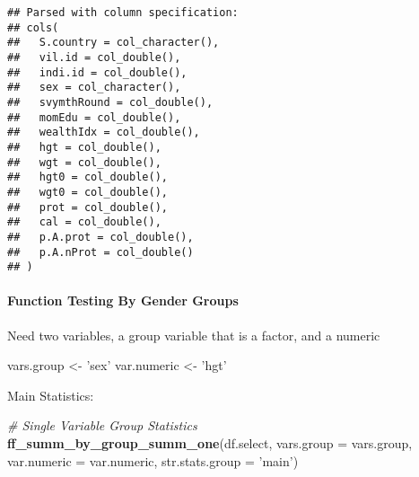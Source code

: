 \documentclass[
]{book}
\newenvironment{Shaded}{\begin{snugshade}}{\end{snugshade}}
\newcommand{\CommentTok}[1]{\textcolor[rgb]{0.56,0.35,0.01}{\textit{#1}}}
\newcommand{\DataTypeTok}[1]{\textcolor[rgb]{0.13,0.29,0.53}{#1}}
\newcommand{\KeywordTok}[1]{\textcolor[rgb]{0.13,0.29,0.53}{\textbf{#1}}}
\newcommand{\NormalTok}[1]{#1}
\newcommand{\OperatorTok}[1]{\textcolor[rgb]{0.81,0.36,0.00}{\textbf{#1}}}
\newcommand{\StringTok}[1]{\textcolor[rgb]{0.31,0.60,0.02}{#1}}
\begin{document}
\begin{verbatim}
## Parsed with column specification:
## cols(
##   S.country = col_character(),
##   vil.id = col_double(),
##   indi.id = col_double(),
##   sex = col_character(),
##   svymthRound = col_double(),
##   momEdu = col_double(),
##   wealthIdx = col_double(),
##   hgt = col_double(),
##   wgt = col_double(),
##   hgt0 = col_double(),
##   wgt0 = col_double(),
##   prot = col_double(),
##   cal = col_double(),
##   p.A.prot = col_double(),
##   p.A.nProt = col_double()
## )
\end{verbatim}

\hypertarget{function-testing-by-gender-groups}{%
\paragraph{Function Testing By Gender Groups}\label{function-testing-by-gender-groups}}

Need two variables, a group variable that is a factor, and a numeric

\begin{Shaded}
\begin{Highlighting}[]
\NormalTok{vars.group <-}\StringTok{ 'sex'}
\NormalTok{var.numeric <-}\StringTok{ 'hgt'}
\end{Highlighting}
\end{Shaded}

\begin{Shaded}
\end{Shaded}

Main Statistics:

\begin{Shaded}
\begin{Highlighting}[]
\CommentTok{# Single Variable Group Statistics}
\KeywordTok{ff_summ_by_group_summ_one}\NormalTok{(df.select, }\DataTypeTok{vars.group =}\NormalTok{ vars.group, }\DataTypeTok{var.numeric =}\NormalTok{ var.numeric, }\DataTypeTok{str.stats.group =} \StringTok{'main'}\NormalTok{)}
\end{Highlighting}
\end{Shaded}
\end{document}

